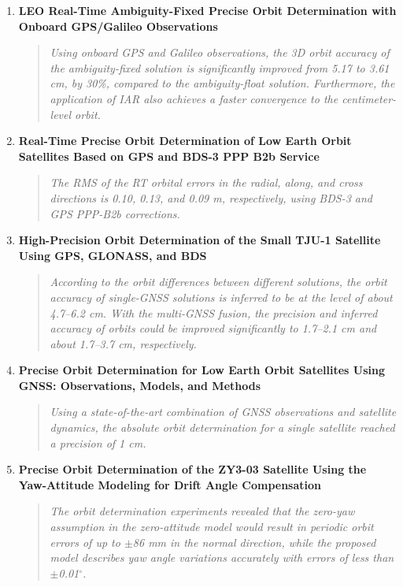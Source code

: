 \begin{enumerate}[label=\textbf{\arabic{enumi}.}, leftmargin=0.5in]
\item \textbf{LEO Real-Time Ambiguity-Fixed Precise Orbit Determination with Onboard GPS/Galileo Observations} \cite{li2024leo}
\begin{quote}
    \textit{Using onboard GPS and Galileo observations, the 3D orbit accuracy of the ambiguity-fixed solution is significantly improved from 5.17 to 3.61 cm, by 30\%, compared to the ambiguity-float solution. Furthermore, the application of IAR also achieves a faster convergence to the centimeter-level orbit.}
\end{quote}

\item \textbf{Real-Time Precise Orbit Determination of Low Earth Orbit Satellites Based on GPS and BDS-3 PPP B2b Service} \cite{shi2024real}
\begin{quote}
    \textit{The RMS of the RT orbital errors in the radial, along, and cross directions is 0.10, 0.13, and 0.09 m, respectively, using BDS-3 and GPS PPP-B2b corrections.}
\end{quote}

\item \textbf{High-Precision Orbit Determination of the Small TJU-1 Satellite Using GPS, GLONASS, and BDS} \cite{10122508}
\begin{quote}
    \textit{According to the orbit differences between different solutions, the orbit accuracy of single-GNSS solutions is inferred to be at the level of about 4.7–6.2 cm. With the multi-GNSS fusion, the precision and inferred accuracy of orbits could be improved significantly to 1.7–2.1 cm and about 1.7–3.7 cm, respectively.}
\end{quote}    

\item \textbf{Precise Orbit Determination for Low Earth Orbit Satellites Using GNSS: Observations, Models, and Methods} \cite{mao2024precise}
\begin{quote}
    \textit{Using a state-of-the-art combination of GNSS observations and satellite dynamics, the absolute orbit determination for a single satellite reached a precision of 1 cm.}
\end{quote}

\item \textbf{Precise Orbit Determination of the ZY3-03 Satellite Using the Yaw-Attitude Modeling for Drift Angle Compensation} \cite{gong2024precise}
\begin{quote}
    \textit{The orbit determination experiments revealed that the zero-yaw assumption in the zero-attitude model would result in periodic orbit errors of up to $\pm$86 mm in the normal direction, while the proposed model describes yaw angle variations accurately with errors of less than $\pm$0.01$^\circ$.}
\end{quote}
    

\end{enumerate}
